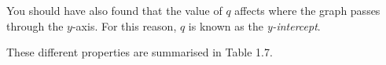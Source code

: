         \label{m39338*id238136}You should have also found that the value of $q$ affects where the graph passes through the $y$-axis. For this reason, $q$ is known as the \textsl{y-intercept}.\par 
        \label{m39338*id238175}These different properties are summarised in Table 1.7.\par 
    \setlength\mytablespace{6\tabcolsep}
    \addtolength\mytablespace{4\arrayrulewidth}
    \setlength\mytablewidth{\linewidth}
    \setlength\mytableroom{\mytablewidth}
    \addtolength\mytableroom{-\mytablespace}
    \setlength\myfixedwidth{0pt}
    \setlength\mystarwidth{\mytableroom}
        \addtolength\mystarwidth{-\myfixedwidth}
        \divide{}

